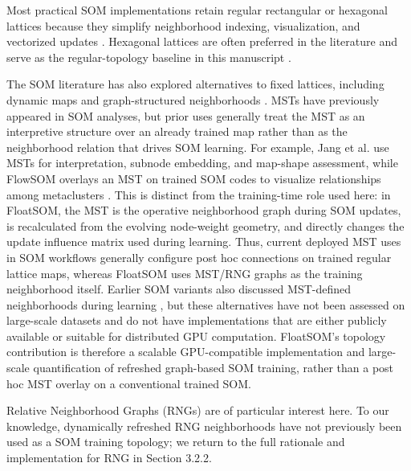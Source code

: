 \documentclass[10pt]{article} %
\begin{document}
Most practical SOM implementations retain regular rectangular or hexagonal lattices because they simplify neighborhood indexing, visualization, and vectorized updates \citep{kohonenSelforganizingMap1990,kohonenEssentialsSelforganizingMap2013}. Hexagonal lattices are often preferred in the literature and serve as the regular-topology baseline in this manuscript \citep{whiteTopologyMattersNetwork2008,kohonenEssentialsSelforganizingMap2013,forestSurveyImplementationPerformance2020}.

The SOM literature has also explored alternatives to fixed lattices, including dynamic maps and graph-structured neighborhoods \citep{vasighiDirectedBatchGrowing2017,spanakisAMSOMAdaptiveMoving2016,kangasVariantsSelforganizingMaps1990,jangUseMinimalSpanning2009}. MSTs have previously appeared in SOM analyses, but prior uses generally treat the MST as an interpretive structure over an already trained map rather than as the neighborhood relation that drives SOM learning. For example, Jang et al. use MSTs for interpretation, subnode embedding, and map-shape assessment, while FlowSOM overlays an MST on trained SOM codes to visualize relationships among metaclusters \citep{jangUseMinimalSpanning2009,vangassenFlowSOMUsingSelforganizing2015}. This is distinct from the training-time role used here: in FloatSOM, the MST is the operative neighborhood graph during SOM updates, is recalculated from the evolving node-weight geometry, and directly changes the update influence matrix used during learning. Thus, current deployed MST uses in SOM workflows generally configure post hoc connections on trained regular lattice maps, whereas FloatSOM uses MST/RNG graphs as the training neighborhood itself. Earlier SOM variants also discussed MST-defined neighborhoods during learning \citep{kangasVariantsSelforganizingMaps1990}, but these alternatives have not been assessed on large-scale datasets and do not have implementations that are either publicly available or suitable for distributed GPU computation. FloatSOM's topology contribution is therefore a scalable GPU-compatible implementation and large-scale quantification of refreshed graph-based SOM training, rather than a post hoc MST overlay on a conventional trained SOM.

Relative Neighborhood Graphs (RNGs) \citep{toussaintRelativeNeighbourhoodGraph1980} are of particular interest here. To our knowledge, dynamically refreshed RNG neighborhoods have not previously been used as a SOM training topology; we return to the full rationale and implementation for RNG in Section 3.2.2.
\end{document}
